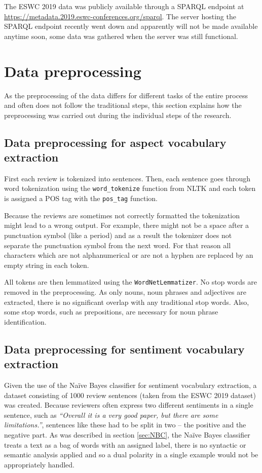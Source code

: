 The ESWC 2019 data was publicly available through a SPARQL endpoint at \url{https://metadata.2019.eswc-conferences.org/sparql}. The server hosting the SPARQL endpoint recently went down and apparently will not be made available anytime soon, some data was gathered when the server was still functional. 


\section{Data preprocessing}
As the preprocessing of the data differs for different tasks of the entire process and often does not follow the traditional steps, this section explains how the preprocessing was carried out during the individual steps of the research.
\subsection{Data preprocessing for aspect vocabulary extraction}
First each review is tokenized into sentences. Then, each sentence goes through word tokenization using the \texttt{word\_tokenize} function from NLTK and each token is assigned a POS tag with the \texttt{pos\_tag} function.

Because the reviews are sometimes not correctly formatted the tokenization might lead to a wrong output. For example, there might not be a space after a punctuation symbol (like a period) and as a result the tokenizer does not separate the punctuation symbol from the next word. For that reason all characters which are not alphanumerical or are not a hyphen are replaced by an empty string in each token.

All tokens are then lemmatized using the \texttt{WordNetLemmatizer}. No stop words are removed in the preprocessing. As only nouns, noun phrases and adjectives are extracted, there is no significant overlap with any traditional stop words. Also, some stop words, such as prepositions, are necessary for noun phrase identification.
\subsection{Data preprocessing for sentiment vocabulary extraction}
\label{sec:data_sl}
Given the use of the Na\"ive Bayes classifier for sentiment vocabulary extraction, a dataset consisting of 1000 review sentences (taken from the ESWC 2019 dataset) was created. Because reviewers often express two different sentiments in a single sentence, such as \textit{``Overall it is a very good paper, but there are some limitations.''}, sentences like these had to be split in two -- the positive and the negative part. As was described in section \ref{sec:NBC}, the Na\"ive Bayes classifier treats a text as a bag of words with an assigned label, there is no syntactic or semantic analysis applied and so a dual polarity in a single example would not be appropriately handled.

